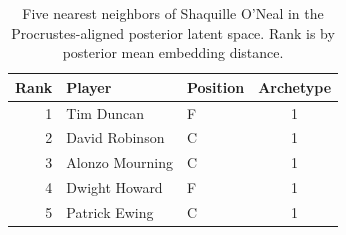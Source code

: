 \begin{table}[htbp]
  \centering\small
  \begin{tabular}{rllc}
    \toprule
    Rank & Player & Position & Archetype \\
    \midrule
    1 & Tim Duncan & F & 1 \\
    2 & David Robinson & C & 1 \\
    3 & Alonzo Mourning & C & 1 \\
    4 & Dwight Howard & F & 1 \\
    5 & Patrick Ewing & C & 1 \\
    \bottomrule
  \end{tabular}
  \caption{Five nearest neighbors of Shaquille O'Neal in the Procrustes-aligned posterior latent space. Rank is by posterior mean embedding distance.}
  \label{tab:Shaquille_O_Neal_neighbors}
\end{table}

